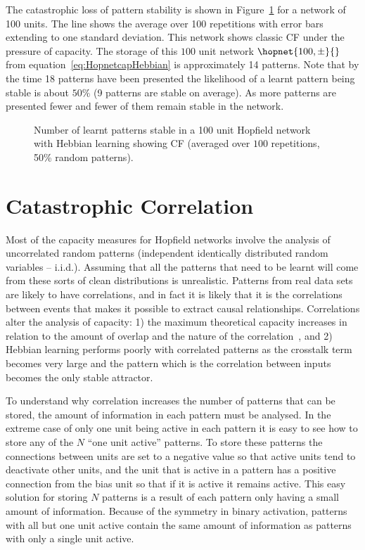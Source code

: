 The catastrophic loss of pattern stability is shown in Figure~\ref{fig:hebb64clean} for a network of 100 units.  The line shows the average over 100 repetitions with error bars extending to one standard deviation. This network shows classic CF under the pressure of capacity.  The storage of this $100$ unit network \(\hopnet{100,\pm}{}\) from equation~\ref{eq:HopnetcapHebbian} is approximately 14 patterns.  Note that by the time 18 patterns have been presented the likelihood of a learnt pattern being stable is about $50\%$ (9 patterns are stable on average).  As more patterns are presented fewer and fewer of them remain stable in the network.  

\begin{figure}[tbp]
\small
\center
	\begin{center}
		
	\end{center}
	\caption{Number of learnt patterns stable in a 100 unit Hopfield network  with Hebbian learning showing CF (averaged over $100$ repetitions, 50\% random patterns).}
	\label{fig:hebb64clean}
\end{figure}

\section{Catastrophic Correlation}
\label{sec:CatastrophicCorrelation}
Most of the capacity measures for Hopfield networks involve the analysis of uncorrelated random patterns (independent identically distributed random variables -- i.i.d.).  Assuming that all the patterns that need to be learnt will come from these sorts of clean distributions is unrealistic.  Patterns from real data sets are likely to have correlations, and in fact it is likely that it is the correlations between events that makes it possible to extract causal relationships.  Correlations alter the analysis of capacity: 1) the maximum theoretical capacity increases in relation to the amount of overlap and the nature of the correlation~\citep{Gardner1988, Lowe1998, Gandolfo1999, Kimoto2002, Bogacz2003}, and 2) Hebbian learning performs poorly with correlated patterns as the crosstalk term becomes very large and the pattern which is the correlation between inputs becomes the only stable attractor.

To understand why correlation increases the number of patterns that can be stored, the amount of information in each pattern must be analysed.  In the extreme case of only one unit being active in each pattern it is easy to see how to store any of the $N$ ``one unit active'' patterns.  To store these patterns the connections between units are set to a negative value so that active units tend to deactivate other units, and the unit that is active in a pattern has a positive connection from the bias unit so that if it is active it remains active.  This easy solution for storing $N$ patterns is a result of each pattern only having a small amount of information.  Because of the symmetry in binary activation, patterns with all but one unit active contain the same amount of information as patterns with only a single unit active.  


